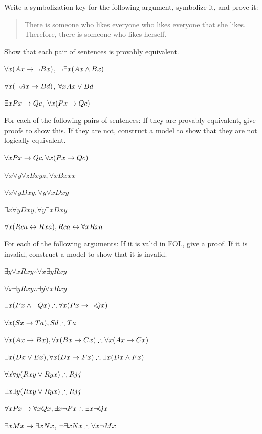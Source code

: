 \begin{practiceproblems}
\solutions
\problempart
\label{pr:likes}
Write a symbolization key for the following argument, symbolize it, and prove it:
\begin{quote}
There is someone who likes everyone who likes everyone that she likes. Therefore, there is someone who likes herself.
\end{quote}


\problempart
Show that each pair of sentences is provably equivalent.
\begin{problemslist}
\item $\forall x (Ax\rightarrow \neg Bx)$, $\neg\exists x(Ax \mathbin{\wedge} Bx)$
\item $\forall x (\neg Ax\rightarrow Bd)$, $\forall x Ax \vee Bd$
\item $\exists x Px \rightarrow Qc$, $\forall x (Px \rightarrow Qc)$
\end{problemslist}

\solutions
\problempart
\label{pr:FOLequivornot}
For each of the following pairs of sentences: If they are provably equivalent, give proofs to show this. If they are not, construct a model to show that they are not logically equivalent.
\begin{problemslist}
\item $\forall x Px \rightarrow Qc, \forall x (Px \rightarrow Qc)$
\item $\forall x\forall y \forall z Bxyz, \forall x Bxxx$
\item $\forall x\forall y Dxy, \forall y\forall x Dxy$
\item $\exists x\forall y Dxy, \forall y\exists x Dxy$
\item $\forall x (Rca \leftrightarrow Rxa), Rca \leftrightarrow \forall x Rxa$
\end{problemslist}

\solutions
\problempart
\label{pr:FOLvalidornot}
For each of the following arguments: If it is valid in FOL, give a proof. If it is invalid, construct a model to show that it is invalid.
\begin{problemslist}
\item $\exists y\forall x Rxy \therefore \forall x\exists y Rxy$
\item $\forall x\exists y Rxy \therefore  \exists y\forall x Rxy$
\item $\exists x(Px \eand \enot Qx) \therefore \forall x(Px \eif \enot Qx)$
\item $\forall x(Sx \eif Ta), Sd \therefore Ta$
\item $\forall x(Ax\eif Bx), \forall x(Bx \eif Cx) \therefore \forall x(Ax \eif Cx)$
\item $\exists x(Dx \eor Ex), \forall x(Dx \eif Fx) \therefore \exists x(Dx \eand Fx)$
\item $\forall x\forall y(Rxy \eor Ryx) \therefore Rjj$
\item $\exists x\exists y(Rxy \eor Ryx) \therefore Rjj$
\item $\forall x Px \eif \forall x Qx, \exists x \enot Px \therefore \exists x \enot Qx$
\item $\exists x Mx \rightarrow \exists x Nx$, $\enot \exists x Nx\therefore  \forall x \enot Mx$
\end{problemslist}

\end{practiceproblems}


